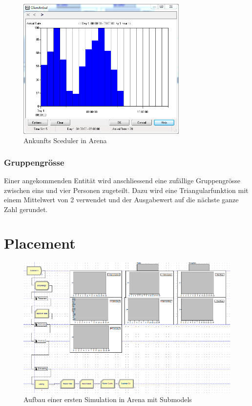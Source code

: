 \documentclass[ngerman,a4paper,12pt]{scrreprt}
\begin{document}
			\begin{figure}[H]
				\centering
					\includegraphics[trim=0.35cm 1.75cm 1cm 1.75cm, clip=true,width=0.75\textwidth]{img/scheduler.png}
					\caption[Arrival Sceduler in Arena]{Ankunfts Sceduler in Arena}
					\label{arrivalSceduler}
			\end{figure}
	
			\subsubsection{Gruppengrösse}
			Einer angekommenden Entität wird anschliessend eine zufällige Gruppengrösse zwischen eins und vier Personen zugeteilt. Dazu wird eine Triangularfunktion mit einem Mittelwert von 2 verwendet und der Ausgabewert auf die nächste ganze Zahl gerundet.
			
	
	\section{Placement}
		\begin{figure}[H]
			\centering
				\includegraphics[width=\textwidth]{img/arena.png}
				\caption[Simulationsaufbau in Arena]{Aufbau einer ersten Simulation in Arena mit Submodels}
				\label{arenaSimulationsAufbau}
		\end{figure}
		
\end{document}

